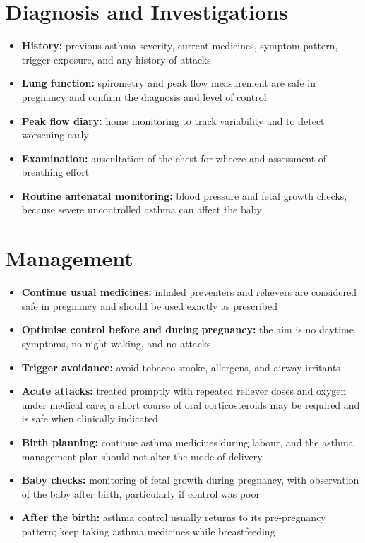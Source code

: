 \section*{Diagnosis and Investigations}
\begin{itemize}
    \item \textbf{History:} previous asthma severity, current medicines, symptom pattern, trigger exposure, and any history of attacks
    \item \textbf{Lung function:} spirometry and peak flow measurement are safe in pregnancy and confirm the diagnosis and level of control
    \item \textbf{Peak flow diary:} home monitoring to track variability and to detect worsening early
    \item \textbf{Examination:} auscultation of the chest for wheeze and assessment of breathing effort
    \item \textbf{Routine antenatal monitoring:} blood pressure and fetal growth checks, because severe uncontrolled asthma can affect the baby
\end{itemize}

\section*{Management}
\begin{itemize}
    \item \textbf{Continue usual medicines:} inhaled preventers and relievers are considered safe in pregnancy and should be used exactly as prescribed
    \item \textbf{Optimise control before and during pregnancy:} the aim is no daytime symptoms, no night waking, and no attacks
    \item \textbf{Trigger avoidance:} avoid tobacco smoke, allergens, and airway irritants
    \item \textbf{Acute attacks:} treated promptly with repeated reliever doses and oxygen under medical care; a short course of oral corticosteroids may be required and is safe when clinically indicated
    \item \textbf{Birth planning:} continue asthma medicines during labour, and the asthma management plan should not alter the mode of delivery
    \item \textbf{Baby checks:} monitoring of fetal growth during pregnancy, with observation of the baby after birth, particularly if control was poor
    \item \textbf{After the birth:} asthma control usually returns to its pre-pregnancy pattern; keep taking asthma medicines while breastfeeding
\end{itemize}

